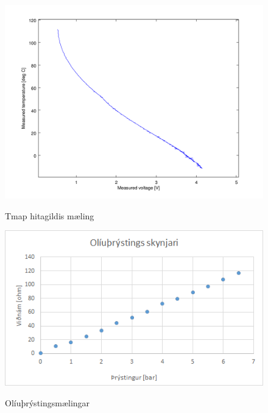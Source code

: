 \documentclass[paper=a4, fontsize=11pt]{scrartcl}
\numberwithin{equation}{section}		%
\numberwithin{figure}{section}			%
\numberwithin{table}{section}				%
\begin{document}
\begin{figure}
	\begin{center}
		\includegraphics[scale=0.9]{tmap_temp_volts.png}\\
        \caption{Tmap hitagildis mæling}
	\end{center}
\end{figure}
\begin{figure}
	\begin{center}
		\includegraphics[]{oilpress.png}\\
        \caption{Olíuþrýstingsmælingar}
	\end{center}
\end{figure}
\end{document}
